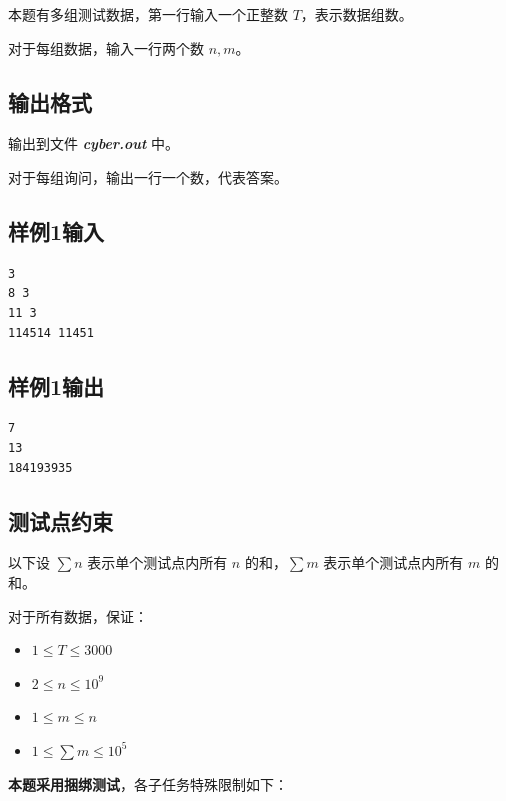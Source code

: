 \documentclass[12pt]{article}
\newcommand{\filename}[1]{{\textbf{\textit{#1}}}}
\begin{document}
本题有多组测试数据，第一行输入一个正整数 $T$，表示数据组数。

对于每组数据，输入一行两个数 $n,m$。

\subsection{输出格式}

输出到文件 \filename{cyber.out} 中。

对于每组询问，输出一行一个数，代表答案。

\subsection{样例1输入}

\begin{lstlisting}
3
8 3
11 3
114514 11451
\end{lstlisting}

\subsection{样例1输出}

\begin{lstlisting}
7
13
184193935
\end{lstlisting}

\subsection{测试点约束}

以下设 $\sum n$ 表示单个测试点内所有 $n$ 的和，$\sum m$ 表示单个测试点内所有 $m$ 的和。

对于所有数据，保证：

\begin{itemize}
  \item $1\le T\le 3000$
  \item $2\le n\le 10^9$
  \item $1\le m\le n$
  \item $1\le \sum m\le 10^5$
\end{itemize}

\textbf{本题采用捆绑测试}，各子任务特殊限制如下：
\end{document}
